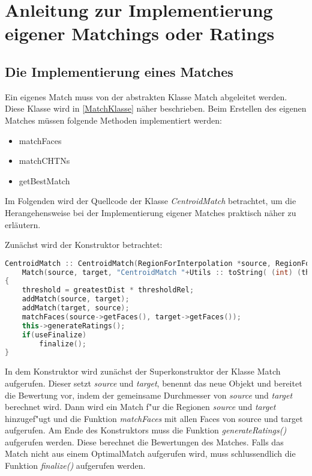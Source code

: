 \chapter{Anleitung zur Implementierung eigener Matchings oder Ratings}\label{eigeneMatch}

\section{Die Implementierung eines Matches}

Ein eigenes Match muss von der abstrakten Klasse Match abgeleitet werden. Diese Klasse wird in \vref{MatchKlasse} näher beschrieben. Beim Erstellen des eigenen Matches müssen folgende Methoden implementiert werden:
\begin{itemize}
\item matchFaces
\item matchCHTNs
\item getBestMatch
\end{itemize}
Im Folgenden wird der Quellcode der Klasse \textit{CentroidMatch} betrachtet, um die Herangehensweise bei der Implementierung eigener Matches praktisch näher zu erläutern.

Zunächst wird der Konstruktor betrachtet:
\begin{lstlisting}[language=c++]
CentroidMatch :: CentroidMatch(RegionForInterpolation *source, RegionForInterpolation *target, double thresholdRel, bool useFinalize=true):
	Match(source, target, "CentroidMatch "+Utils :: toString( (int) (thresholdRel * 100)) + " %" , "this implements the position of centroids Match, known from the paper of Erlend Tossebro (5.2 1)")
{
    threshold = greatestDist * thresholdRel;                                
    addMatch(source, target);
    addMatch(target, source);
    matchFaces(source->getFaces(), target->getFaces());
    this->generateRatings();
    if(useFinalize)	    
    	finalize();
}
\end{lstlisting}
In dem Konstruktor wird zunächst der Superkonstruktor der Klasse Match aufgerufen. Dieser setzt \textit{source} und \textit{target}, benennt das neue Objekt und bereitet die Bewertung vor, indem der gemeinsame Durchmesser von \textit{source} und \textit{target} berechnet wird. Dann wird ein Match f"ur die Regionen \textit{source} und \textit{target} hinzugef"ugt und die Funktion \textit{matchFaces} mit allen Faces von source und target aufgerufen. Am Ende des Konstruktors muss die Funktion \textit{generateRatings()} aufgerufen werden. Diese berechnet die Bewertungen des Matches. Falls das Match nicht aus einem OptimalMatch aufgerufen wird, muss schlussendlich die Funktion \textit{finalize()} aufgerufen werden.

